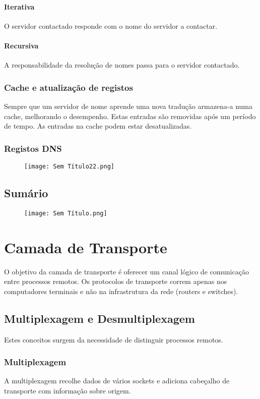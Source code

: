 \documentclass[10pt,a4paper]{report}
\begin{document}
\subsubsection{Iterativa}
O servidor contactado responde com o nome do servidor a contactar.
\subsubsection{Recursiva}
A responsabilidade da resolução de nomes passa para o servidor contactado.
\subsection{Cache e atualização de registos}
Sempre que um servidor de nome aprende uma nova tradução armazena-a numa cache, melhorando o desempenho. Estas entradas são removidas após um período de tempo.
As entradas na cache podem estar desatualizadas.
\subsection{Registos DNS}
\begin{figure}[h]
\texttt{[image: Sem Título22.png]}
\end{figure}
\section{Sumário}
\begin{figure}[h]
\texttt{[image: Sem Título.png]}
\end{figure}

\chapter{Camada de Transporte}
O objetivo da camada de transporte é oferecer um canal lógico de comunicação entre processos remotos. Os protocolos de transporte correm apenas nos computadores terminais e não na infrastrutura da rede (routers e switches).
\minitoc
\section{Multiplexagem e Desmultiplexagem}
Estes conceitos surgem da necessidade de distinguir processos remotos.
\subsection{Multiplexagem}
A multiplexagem recolhe dados de vários sockets e adiciona cabeçalho de transporte com informação sobre origem.
\end{document}
